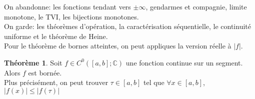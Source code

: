 \documentclass[10pt,a4paper]{article}
\theoremstyle{definition}
\newtheorem{theorem}[proposition]{Théorème}
\begin{document}
\noindent On abandonne: les fonctions tendant vers $\pm\infty$, gendarmes et compagnie, limite monotone, le TVI, les bijections monotones. \\
On garde: les théorèmes d'opération, la caractérisation séquentielle, le continuité uniforme et le théorème de Heine. \\
Pour le théorème de bornes atteintes, on peut appliques la version réelle à $|f|$.
\begin{theorem}
Soit $f \in C^0([a, b]; \mathbb{C})$ une fonction continue sur un segment. \\
Alors $f$ est bornée. \\
Plus précisément, on peut trouver $\tau \in [a, b]$ tel que $\forall x \in [a, b]$, $|f(x)| \leq |f(\tau)|$
\end{theorem}
\end{document}
